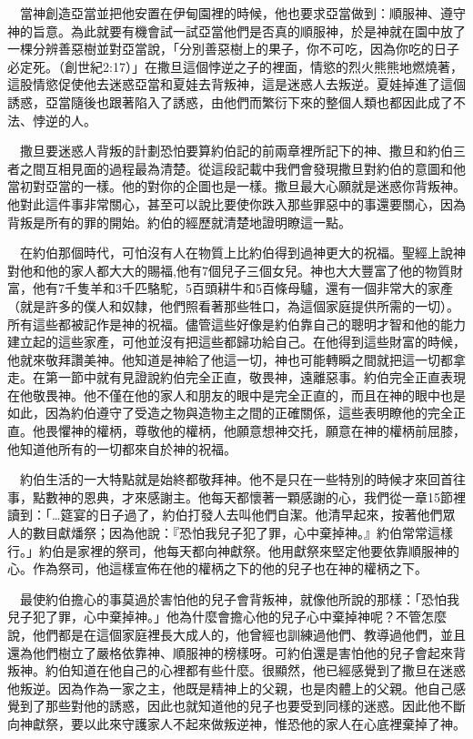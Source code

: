 \documentclass{book}
\begin{document}
　當神創造亞當並把他安置在伊甸園裡的時候，他也要求亞當做到：順服神、遵守神的旨意。為此就要有機會試一試亞當他們是否真的順服神，於是神就在園中放了一棵分辨善惡樹並對亞當說，「分別善惡樹上的果子，你不可吃，因為你吃的日子必定死。（創世紀2:17）」在撒旦這個悖逆之子的裡面，情慾的烈火熊熊地燃燒著，這股情慾促使他去迷惑亞當和夏娃去背叛神，這是迷惑人去叛逆。夏娃掉進了這個誘惑，亞當隨後也跟著陷入了誘惑，由他們而繁衍下來的整個人類也都因此成了不法、悖逆的人。

　撒旦要迷惑人背叛的計劃恐怕要算約伯記的前兩章裡所記下的神、撒旦和約伯三者之間互相見面的過程最為清楚。從這段記載中我們會發現撒旦對約伯的意圖和他當初對亞當的一樣。他的對你的企圖也是一樣。撒旦最大心願就是迷惑你背叛神。他對此這件事非常關心，甚至可以說比要使你跌入那些罪惡中的事還要關心，因為背叛是所有的罪的開始。約伯的經歷就清楚地證明瞭這一點。

　在約伯那個時代，可怕沒有人在物質上比約伯得到過神更大的祝福。聖經上說神對他和他的家人都大大的賜福,他有7個兒子三個女兒。神也大大豐富了他的物質財富，他有7千隻羊和3千匹駱駝，5百頭耕牛和5百條母驢，還有一個非常大的家產（就是許多的僕人和奴隸，他們照看著那些牲口，為這個家庭提供所需的一切）。所有這些都被記作是神的祝福。儘管這些好像是約伯靠自己的聰明才智和他的能力建立起的這些家產，可他並沒有把這些都歸功給自己。在他得到這些財富的時候，他就來敬拜讚美神。他知道是神給了他這一切，神也可能轉瞬之間就把這一切都拿走。在第一節中就有見證說約伯完全正直，敬畏神，遠離惡事。約伯完全正直表現在他敬畏神。他不僅在他的家人和朋友的眼中是完全正直的，而且在神的眼中也是如此，因為約伯遵守了受造之物與造物主之間的正確關係，這些表明瞭他的完全正直。他畏懼神的權柄，尊敬他的權柄，他願意想神交托，願意在神的權柄前屈膝，他知道他所有的一切都來自於神的祝福。

　約伯生活的一大特點就是始終都敬拜神。他不是只在一些特別的時候才來回首往事，點數神的恩典，才來感謝主。他每天都懷著一顆感謝的心，我們從一章15節裡讀到：「…筵宴的日子過了，約伯打發人去叫他們自潔。他清早起來，按著他們眾人的數目獻燔祭；因為他說：『恐怕我兒子犯了罪，心中棄掉神。』約伯常常這樣行。」約伯是家裡的祭司，他每天都向神獻祭。他用獻祭來堅定他要依靠順服神的心。作為祭司，他這樣宣佈在他的權柄之下的他的兒子也在神的權柄之下。

　最使約伯擔心的事莫過於害怕他的兒子會背叛神，就像他所說的那樣：「恐怕我兒子犯了罪，心中棄掉神。」他為什麼會擔心他的兒子心中棄掉神呢？不管怎麼說，他們都是在這個家庭裡長大成人的，他曾經也訓練過他們、教導過他們，並且還為他們樹立了嚴格依靠神、順服神的榜樣呀。可約伯還是害怕他的兒子會起來背叛神。約伯知道在他自己的心裡都有些什麼。很顯然，他已經感覺到了撒旦在迷惑他叛逆。因為作為一家之主，他既是精神上的父親，也是肉體上的父親。他自己感覺到了那些對他的誘惑，因此也就知道他的兒子也要受到同樣的迷惑。因此他不斷向神獻祭，要以此來守護家人不起來做叛逆神，惟恐他的家人在心底裡棄掉了神。
\end{document}
